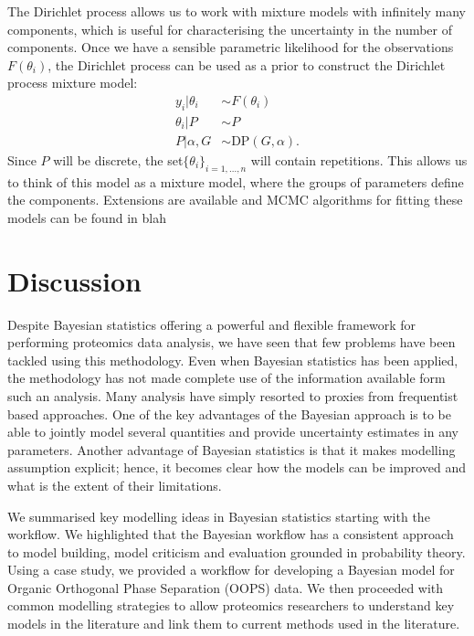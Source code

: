\documentclass[12pt,english]{article}
\begin{document}
The Dirichlet process allows us to work with mixture models with infinitely many components, which is useful for characterising the uncertainty in the number of components. Once we have a sensible parametric likelihood for the observations $F(\theta_i)$, the Dirichlet process can be used as a prior to construct the Dirichlet process mixture model:
\begin{equation}
\begin{split}
y_i|\theta_i &\sim F(\theta_i)\\
\theta_i|P &\sim P \\
P|\alpha, G & \sim \text{DP}(G, \alpha).
\end{split}
\end{equation}
Since $P$ will be discrete, the set$\{\theta_i\}_{i = 1,...,n}$ will contain repetitions. This allows us to think of this model as a mixture model, where the groups of parameters define the components. Extensions are available and MCMC algorithms for fitting these models can be found in blah

\section{Discussion}
Despite Bayesian statistics offering a powerful and flexible framework for performing proteomics data analysis, we have seen that few problems have been tackled using this methodology. Even when Bayesian statistics has been applied, the methodology has not made complete use of the information available form such an analysis. Many analysis have simply resorted to proxies from frequentist based approaches. One of the key advantages of the Bayesian approach is to be able to jointly model several quantities and provide uncertainty estimates in any parameters. Another advantage of Bayesian statistics is that it makes modelling assumption explicit; hence, it becomes clear how the models can be improved and what is the extent of their limitations.

We summarised key modelling ideas in Bayesian statistics starting with the workflow. We highlighted that the Bayesian workflow has a consistent approach to model building, model criticism and evaluation grounded in probability theory. Using a case study, we provided a workflow for developing a Bayesian model for Organic Orthogonal Phase Separation (OOPS) data. We then proceeded with common modelling strategies to allow proteomics researchers to understand key models in the literature and link them to current methods used in the literature.
\end{document}
